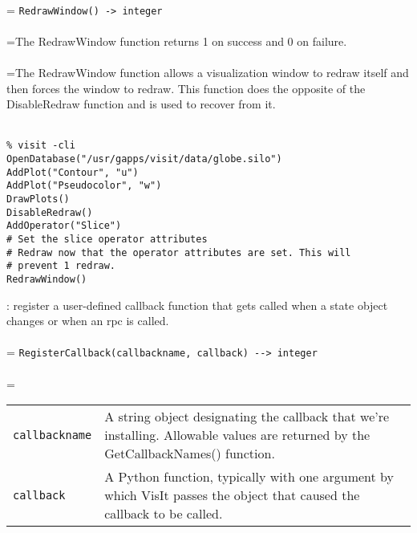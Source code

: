\documentclass[10pt,a4paper]{report}
\begin{document}
 \\ 
\hangindent=\parindent 
\verb!RedrawWindow() -> integer!\\ [-3mm]

 \\ 
\hangindent=\parindent The RedrawWindow function returns 1 on success and 0 on failure. \\[-3mm] 

 \\ 
\hangindent=\parindent The RedrawWindow function allows a visualization window to redraw itself and then forces the window to redraw. This function does the opposite of the DisableRedraw function and is used to recover from it. \\[-3mm] 

\\[-6mm]
\begin{verbatim}% visit -cli
OpenDatabase("/usr/gapps/visit/data/globe.silo")
AddPlot("Contour", "u")
AddPlot("Pseudocolor", "w")
DrawPlots()
DisableRedraw()
AddOperator("Slice")
# Set the slice operator attributes
# Redraw now that the operator attributes are set. This will 
# prevent 1 redraw.
RedrawWindow()
\end{verbatim}
\newpage


{}
: register a user-defined callback function that gets called when a state object changes or when an rpc is called.\\[-3mm]

 \\ 
\hangindent=\parindent 
\verb!RegisterCallback(callbackname, callback) --> integer!\\ [-3mm]

 \\ 
\hangindent=\parindent 
\begin{tabular}{lp{9cm}}
\verb!callbackname! & A string object designating the callback that we're installing. Allowable values are returned by the GetCallbackNames() function. \\
\verb!callback! & A Python function, typically with one argument by which VisIt passes the object that caused the callback to be called. \\
\end{tabular} \\[-2mm]
\end{document}
